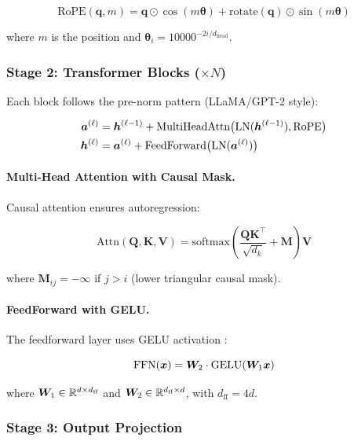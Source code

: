 \begin{equation}
    \text{RoPE}(\bm{q}, m) = \bm{q} \odot \cos(m\bm{\theta}) + \text{rotate}(\bm{q}) \odot \sin(m\bm{\theta})
\end{equation}

where $m$ is the position and $\bm{\theta}_i = 10000^{-2i/d_{\text{head}}}$.

\subsubsection{Stage 2: Transformer Blocks ($\times N$)}

Each block follows the pre-norm pattern (LLaMA/GPT-2 style):

\begin{align}
    \bm{a}^{(\ell)} &= \bm{h}^{(\ell-1)} + \text{MultiHeadAttn}\big(\text{LN}(\bm{h}^{(\ell-1)}), \text{RoPE}\big) \label{eq:attn} \\
    \bm{h}^{(\ell)} &= \bm{a}^{(\ell)} + \text{FeedForward}\big(\text{LN}(\bm{a}^{(\ell)})\big) \label{eq:ffn}
\end{align}

\paragraph{Multi-Head Attention with Causal Mask.}
Causal attention ensures autoregression:

\begin{equation}
    \text{Attn}(\bm{Q}, \bm{K}, \bm{V}) = \text{softmax}\left(\frac{\bm{Q}\bm{K}^\top}{\sqrt{d_k}} + \bm{M}\right)\bm{V}
\end{equation}

where $\bm{M}_{ij} = -\infty$ if $j > i$ (lower triangular causal mask).

\paragraph{FeedForward with GELU.}
The feedforward layer uses GELU activation \cite{hendrycks2016gelu}:

\begin{equation}
    \text{FFN}(\bm{x}) = \bm{W}_2 \cdot \text{GELU}(\bm{W}_1 \bm{x})
\end{equation}

where $\bm{W}_1 \in \mathbb{R}^{d \times d_{\text{ff}}}$ and
$\bm{W}_2 \in \mathbb{R}^{d_{\text{ff}} \times d}$, with $d_{\text{ff}} = 4d$.

\subsubsection{Stage 3: Output Projection}

